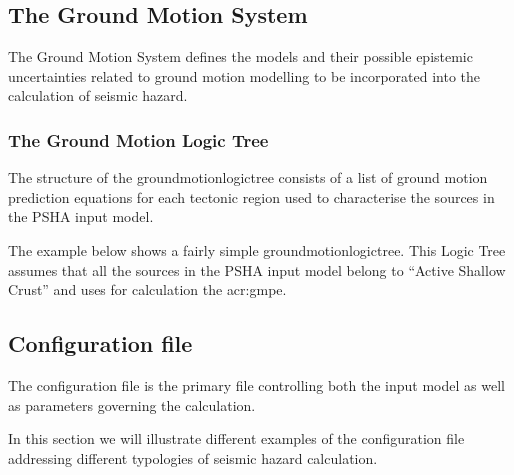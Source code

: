 \subsection{The Ground Motion System}
The Ground Motion System defines the models and their possible epistemic 
uncertainties related to ground motion modelling to be incorporated 
into the calculation of seismic hazard.
%
\subsubsection{The Ground Motion Logic Tree}
\label{ref:gmlt_example}
The structure of the \gls{groundmotionlogictree} consists of a list 
of ground motion prediction equations for each tectonic region used to
characterise the sources in the PSHA input model.

The example below shows a fairly simple \gls{groundmotionlogictree}. 
This Logic Tree assumes that all the sources in the PSHA input model 
belong to ``Active Shallow Crust'' and uses for calculation the 
\citet{chiou2008} \gls{acr:gmpe}.

%
\subsection{Configuration file}
\label{sec:conf_file}
The configuration file is the primary file controlling both the input 
model as well as parameters governing the calculation.

In this section we will illustrate different examples of the configuration
file addressing different typologies of seismic hazard calculation.



